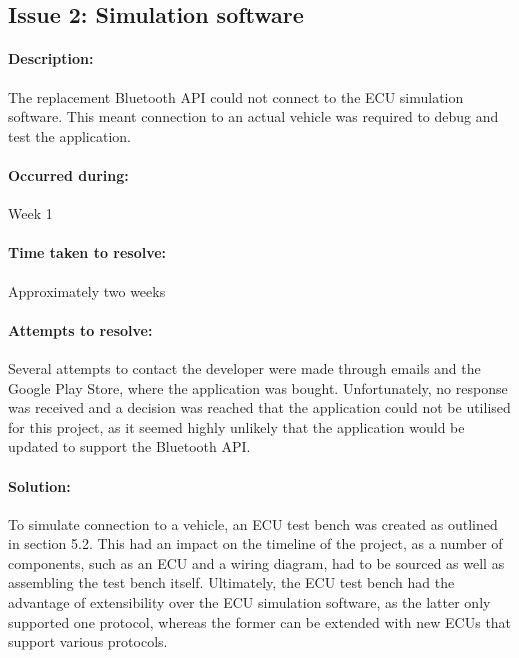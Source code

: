 	\subsection{Issue 2: Simulation software}
		\paragraph{Description:}{
		The replacement Bluetooth API could not connect to the ECU simulation software. This meant connection to an actual vehicle was required to debug and test the application.
		}
		\paragraph{Occurred during:}{
		Week 1
		}
		\paragraph{Time taken to resolve:}{
		Approximately two weeks
		}
		\paragraph{Attempts to resolve:}{
		Several attempts to contact the developer were made through emails and the Google Play Store, where the application was bought. Unfortunately, no response was received and a decision was reached that the application could not be utilised for this project, as it seemed highly unlikely that the application would be updated to support the Bluetooth API. 
		}
		\paragraph{Solution:}{
		To simulate connection to a vehicle, an ECU test bench was created as outlined in section 5.2. This had an impact on the timeline of the project, as a number of components, such as an ECU and a wiring diagram, had to be sourced as well as assembling the test bench itself. Ultimately, the ECU test bench had the advantage of extensibility over the ECU simulation software, as the latter only supported one protocol, whereas the former can be extended with new ECUs that support various protocols.
		}